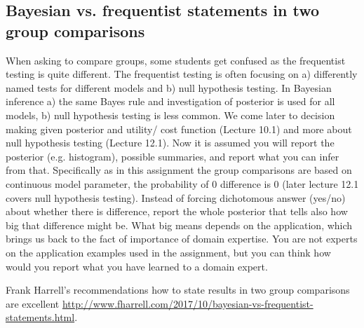 \documentclass[a4paper,11pt,english]{article}
\begin{document}
\subsection*{Bayesian vs. frequentist statements in two group comparisons}

When asking to compare groups, some students get confused as the
frequentist testing is quite different. The frequentist testing is
often focusing on a) differently named tests for different models and
b) null hypothesis testing. In Bayesian inference a) the same Bayes
rule and investigation of posterior is used for all models, b) null
hypothesis testing is less common. We come later to decision making
given posterior and utility/ cost function (Lecture 10.1) and more
about null hypothesis testing (Lecture 12.1). Now it is assumed you
will report the posterior (e.g. histogram), possible summaries, and
report what you can infer from that.  Specifically as in this
assignment the group comparisons are based on continuous model
parameter, the probability of 0 difference is 0 (later lecture 12.1
covers null hypothesis testing). Instead of forcing dichotomous answer
(yes/no) about whether there is difference, report the whole posterior
that tells also how big that difference might be. What big means
depends on the application, which brings us back to the fact of
importance of domain expertise. You are not experts on the application
examples used in the assignment, but you can think how would you
report what you have learned to a domain expert.

Frank Harrell's recommendations how to state results in two group
comparisons are excellent
\url{http://www.fharrell.com/2017/10/bayesian-vs-frequentist-statements.html}.
\end{document}
